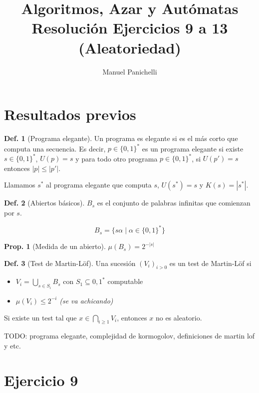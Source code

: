 \documentclass{article}
\author{Manuel Panichelli}
\title{Algoritmos, Azar y Autómatas\\Resolución Ejercicios 9 a 13 (Aleatoriedad)}
\theoremstyle{definition} %
\newtheorem{proposition}{Prop.}
\newtheorem{definition}{Def.}
\newcommand{\measure}[1]{\mu(#1)}
\newcommand{\sucML}{(V_i)_{i > 0}}
\newcommand{\ZOalphabet}{\{0, 1\}^*}
\begin{document}
\maketitle

\section*{Resultados previos}

\begin{definition}[Programa elegante]\label{def:prog-elegante}
    Un programa es elegante si es el más corto que computa una secuencia. Es
    decir, $p \in \ZOalphabet$ es un programa elegante si existe $s \in
    \ZOalphabet$, $U(p) = s$ y para todo otro programa $p \in \ZOalphabet$, si
    $U(p') = s$ entonces $|p| \leq |p'|$.

    Llamamos $s^*$ al programa elegante que computa $s$, $U(s^*) = s$ y $K(s) = |s^*|$.
\end{definition}

\begin{definition}[Abiertos básicos]
    $B_s$ es el conjunto de palabras infinitas que comienzan por $s$.

    \[B_s = \{ s \alpha \mid \alpha \in \{0, 1\}^* \}\]

\begin{proposition}[Medida de un abierto]
    $\measure{B_s} = 2^{-|s|}$
\end{proposition}
\end{definition}

\begin{definition}[Test de Martin-Löf]
    Una sucesión $\sucML$ es un test de Martin-Löf si

    \begin{itemize}
        \item $V_i = \bigcup_{s \in S_i} B_s$ con $S_1 \subseteq {0, 1}^*$
        computable
        \item $\measure{V_i} \leq 2^{-i}$ \textit{(se va achicando)}
    \end{itemize}

    Si existe un test tal que $x \in \bigcap_{i \geq 1} V_i$, entonces $x$ no es
    aleatorio.
\end{definition}

TODO: programa elegante, complejidad de kormogolov, definiciones de martin lof y
etc.

\section*{Ejercicio 9}
\end{document}
